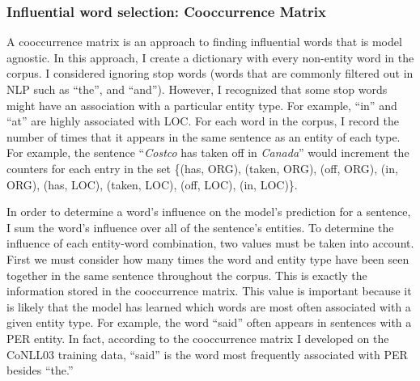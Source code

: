 \subsubsection{Influential word selection: Cooccurrence Matrix}
A cooccurrence matrix is an approach to finding influential words that is model agnostic. In this approach, I create a dictionary with every non-entity word in the corpus. I considered ignoring stop words (words that are commonly filtered out in NLP such as ``the'', and ``and''). However, I recognized that some stop words might have an association with a particular entity type. For example, ``in'' and ``at'' are highly associated with \textsc{LOC}. For each word in the corpus, I record the number of times that it appears in the same sentence as an entity of each type. For example, the sentence ``\textit{Costco} has taken off in \textit{Canada}'' would increment the counters for each entry in the set  \{(has, \textsc{ORG}), (taken, \textsc{ORG}), (off, \textsc{ORG}), (in, \textsc{ORG}), (has, \textsc{LOC}), (taken, \textsc{LOC}), (off, \textsc{LOC}), (in, \textsc{LOC})\}. 

In order to determine a word's influence on the model's prediction for a sentence, I sum the word's influence over all of the sentence's entities. To determine the influence of each entity-word combination, two values must be taken into account. First we must consider how many times the word and entity type have been seen together in the same sentence throughout the corpus. This is exactly the information stored in the cooccurrence matrix. This value is important because it is likely that the model has learned which words are most often associated with a given entity type. For example, the word ``said'' often appears in sentences with a \textsc{PER} entity. In fact, according to the cooccurrence matrix I developed on the CoNLL03 training data, ``said'' is the word most frequently associated with \textsc{PER} besides ``the.'' 

